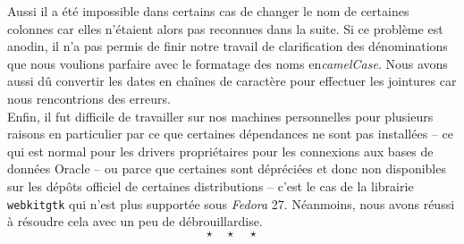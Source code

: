 	Aussi il a été impossible dans certains cas de changer le nom de certaines colonnes car elles n'étaient alors pas reconnues dans la suite. Si ce problème est anodin, il n'a pas permis de finir notre travail de clarification des dénominations que nous voulions parfaire avec le formatage des noms en\textit{camelCase}. Nous avons aussi dû convertir les dates en chaînes de caractère pour effectuer les jointures car nous rencontrions des erreurs.\\
	
	Enfin, il fut difficile de travailler sur nos machines personnelles pour plusieurs raisons en particulier par ce que certaines dépendances ne sont pas installées -- ce qui est normal pour les drivers propriétaires pour les connexions aux bases de données Oracle -- ou parce que certaines sont dépréciées et donc non disponibles sur les dépôts officiel de certaines distributions -- c'est le cas de la librairie \texttt{webkitgtk} qui n'est plus supportée sous \textit{Fedora} 27. Néanmoins, nous avons réussi à résoudre cela avec un peu de débrouillardise.\\
	
	\[ \star \quad \star \quad \star \]
  
\newpage
\nocite{*}
%


%
%

%

